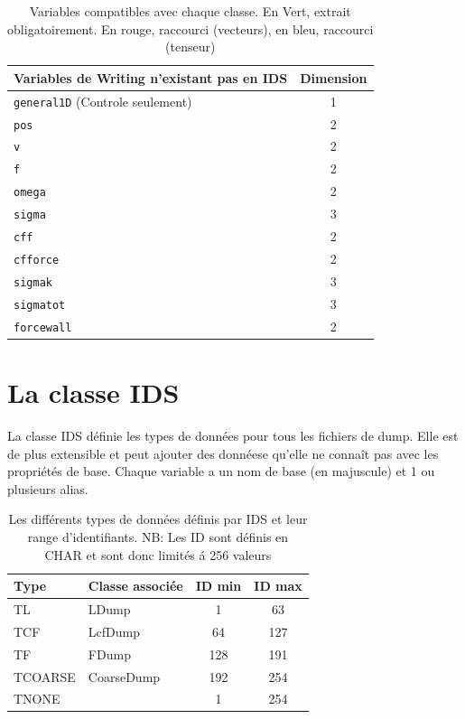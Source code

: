\documentclass[a4paper,12pt]{article}
\begin{document}
{{{\begin{table}
\begin{tabular}{|l|c|}\hline
Variables de Writing n'existant pas en IDS & Dimension \\\hline
\verb+general1D+ (Controle seulement) & 1\\
\verb+pos+ & 2\\
\verb+v+ & 2\\
\verb+f+ & 2\\
\verb+omega+ & 2 \\
\verb+sigma+ & 3 \\
\verb+cff+ & 2 \\
\verb+cfforce+ & 2 \\
\verb+sigmak+ & 3 \\
\verb+sigmatot+ & 3 \\
\verb+forcewall+ & 2 \\\hline
\end{tabular}
\caption{Variables compatibles avec chaque classe. En Vert, extrait obligatoirement. En rouge, raccourci (vecteurs), en bleu, raccourci (tenseur)}
\end{table}

\newpage
\section{La classe IDS}
La classe IDS d\'efinie les types de donn\'ees pour tous les fichiers de dump. Elle est de plus extensible et peut ajouter des donn\'eese qu'elle ne conna\^it pas avec les propri\'et\'es de base. Chaque variable a un nom de base (en majuscule) et 1 ou plusieurs alias.

\begin{table}
\begin{tabular}{|l|l|c|c|}\hline
Type & Classe associ\'ee & ID min & ID max \\ \hline
TL & LDump & 1 & 63 \\\hline
TCF & LcfDump & 64 & 127 \\\hline
TF & FDump & 128 & 191 \\\hline
TCOARSE & CoarseDump & 192 & 254 \\\hline
TNONE  & & 1 & 254 \\\hline
\end{tabular}
\caption{Les diff\'erents types de donn\'ees d\'efinis par IDS et leur range d'identifiants. NB: Les ID sont d\'efinis en CHAR et sont donc limit\'es \'a 256 valeurs}
\end{table}

}}}
\end{document}
